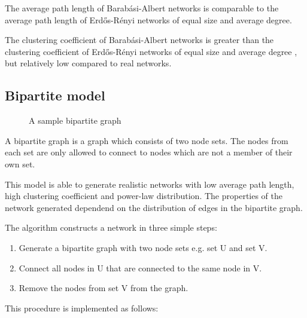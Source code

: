 \documentclass[a4paper,11pt,titlepage]{article}
\begin{document}
The average path length of Barab\'{a}si-Albert networks is comparable to the
average path length of Erd\H{o}s-R\'{e}nyi networks of equal size and average
degree.

The clustering coefficient of Barab\'{a}si-Albert networks is greater than the
clustering coefficient of Erd\H{o}s-R\'{e}nyi networks of equal size and average
degree \cite{oconn11}, but relatively low compared to real networks.

\subsection{Bipartite model}

\begin{figure}
  \begin{center}
    
  \end{center}
  \caption{A sample bipartite graph}
\end{figure}

A bipartite graph is a graph which consists of two node sets. The nodes from
each set are only allowed to connect to nodes which are not a member of their
own set.

This model is able to generate realistic networks with low average path length,
high clustering coefficient and power-law distribution. The properties of the
network generated dependend on the distribution of edges in the bipartite
graph.

The algorithm constructs a network in three simple steps:

\begin{enumerate}
  \item Generate a bipartite graph with two node sets e.g. set U and set V.
  \item Connect all nodes in U that are connected to the same node in V.
  \item Remove the nodes from set V from the graph.
\end{enumerate}

This procedure is implemented as follows:
\end{document}
